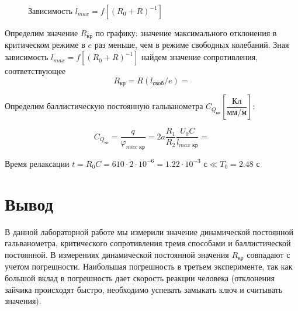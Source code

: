 \documentclass[a4paper, 12pt]{article}
\begin{document}
\begin {figure}[H]
	\begin{center}
		
		\caption{Зависимость $l_{max} = f[(R_0+R)^{-1}]$}
	\end{center}
\end {figure}

Определим значение $R_\text{кр}$ по графику: значение максимального отклонения в критическом режиме в $e$ раз меньше, чем в режиме свободных колебаний. Зная зависимость $l_{max} = f[(R_0+R)^{-1}]$ найдем значение сопротивления, соответствующее 
$$R_\text{кр} = R(l_{\text{своб}}/e) = $$

Определим баллистическую постоянную гальванометра $C_{Q_\text{кр}} \left[\dfrac{\text{Кл}}{\text{мм/м}} \right]$:

$$C_{Q_\text{кр}} = \dfrac{q}{\varphi_{max \text{ кр}}} = 2a \dfrac{R_1}{R_2} \dfrac{U_0C}{l_{max \text{ кр}}} = $$

Время релаксации $t = R_0C = 610 \cdot 2 \cdot 10^{-6} = 1.22 \cdot 10^{-3} \text{ с} \ll T_0 = 2.48 \text{ с}$

\section{Вывод}

В данной лабораторной работе мы измерили значение динамической постоянной гальванометра, критического сопротивления тремя способами и баллистической постоянной. В измерениях динамической постоянной значения $R_\text{кр}$ совпадают с учетом погрешности. Наибольшая погрешность в третьем эксперименте, так как большой вклад в погрешность дает скорость реакции человека (отклонения зайчика происходят быстро, необходимо успевать замыкать ключ и считывать значения).
\end{document}
